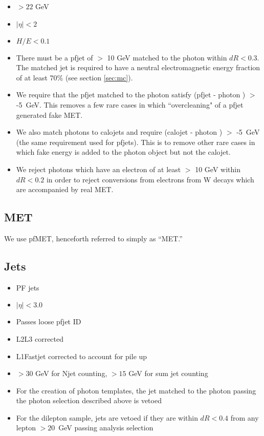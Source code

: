 \begin{itemize}
\item \pt $ > 22$ GeV
\item $|\eta| < 2$
\item $H/E < 0.1$
\item There must be a pfjet of \pt $ >$ 10 GeV 
matched to the photon within $dR < 0.3$. The matched jet is required to have 
a neutral electromagnetic energy fraction of at least 
70\% (see section \ref{sec:mc}).

\item 
  We require that the pfjet \pt matched to the photon satisfy
  (pfjet \pt - photon \pt) $>$ -5~GeV.
  This removes a few rare cases in which ``overcleaning" of a
  pfjet
  generated fake MET.

\item We also match photons to calojets and require (calojet \pt - photon \pt) $>$ -5~GeV
  (the same requirement used for pfjets). This is to remove other rare cases in which fake
  energy is added to the photon object but not the calojet.

\item We reject photons which have an electron of at least \pt $>$ 10 GeV 
  within $dR < 0.2$
  in order to reject
  conversions from electrons from W decays which are accompanied by real MET.

\end{itemize}


\subsection{MET}

We use pfMET, henceforth referred to simply as ``MET.''


\subsection{Jets}
\label{sec:jetsel}

\begin{itemize}
\item PF jets
\item $|\eta| < 3.0$ %
\item Passes loose pfjet ID
\item L2L3 corrected
\item L1Fastjet corrected to account for pile up
\item \pt $ > 30$ GeV for Njet counting, \pt $ > 15$ GeV for sum jet \pt counting
\item For the creation of photon templates, the jet matched to the photon passing the photon selection described above is vetoed
\item For the dilepton sample, jets are vetoed if they are within $dR < 0.4$ from any lepton \pt $ > 20$~GeV passing analysis selection
\end{itemize}

